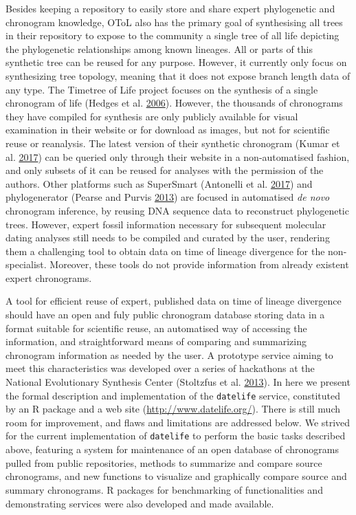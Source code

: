 \documentclass[]{article}
\begin{document}
Besides keeping a repository to easily store and share expert phylogenetic and chronogram knowledge, OToL also has the primary goal of synthesising all trees in their repository to expose to the community a single tree of all life depicting the phylogenetic relationships among known lineages.
All or parts of this synthetic tree can be reused for any purpose. However, it currently only focus on synthesizing tree topology, meaning that it does not expose branch length data of any type.
The Timetree of Life project focuses on the synthesis of a single chronogram of life (Hedges et al. \protect\hyperlink{ref-Hedges2006}{2006}). However, the thousands of chronograms they have compiled for synthesis are only publicly available for visual examination in their website or for download as images, but not for scientific reuse or reanalysis. The latest version of their synthetic chronogram (Kumar et al. \protect\hyperlink{ref-Kumar2017}{2017}) can be queried only through their website in a non-automatised fashion, and only subsets of it can be reused for analyses with the permission of the authors.
Other platforms such as SuperSmart (Antonelli et al. \protect\hyperlink{ref-antonelli2017supersmart}{2017}) and phylogenerator (Pearse and Purvis \protect\hyperlink{ref-pearse2013phylogenerator}{2013}) are focused in automatised \emph{de novo} chronogram inference, by reusing DNA sequence data to reconstruct phylogenetic trees. However, expert fossil information necessary for subsequent molecular dating analyses still needs to be compiled and curated by the user, rendering them a challenging tool to obtain data on time of lineage divergence for the non-specialist. Moreover, these tools do not provide information from already existent expert chronograms.

A tool for efficient reuse of expert, published data on time of lineage divergence should have an open and fuly public chronogram database storing data in a format suitable for scientific reuse, an automatised way of accessing the information, and straightforward means of comparing and summarizing chronogram information as needed by the user.
A prototype service aiming to meet this characteristics was developed over a series of hackathons at the National Evolutionary Synthesis Center (Stoltzfus et al. \protect\hyperlink{ref-Stoltzfus2013}{2013}).
In here we present the formal description and implementation of the \texttt{datelife} service, constituted by an R package and a web site (\url{http://www.datelife.org/}). There is still much room for improvement, and flaws and limitations are addressed below. We strived for the current implementation of \texttt{datelife} to perform the basic tasks described above, featuring a system for maintenance of an open database of chronograms pulled from public repositories, methods to summarize and compare source chronograms, and new functions to visualize and graphically compare source and summary chronograms.
R packages for benchmarking of functionalities and demonstrating services were also developed and made available.
\end{document}
